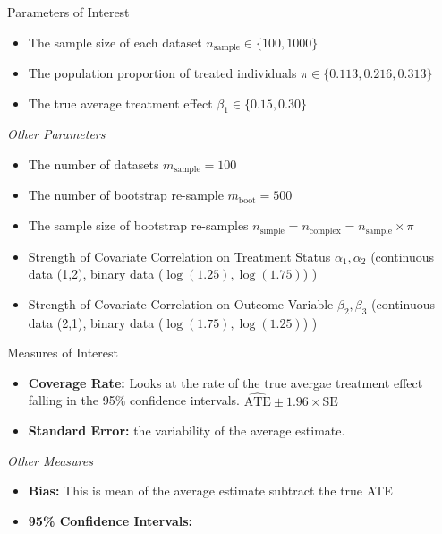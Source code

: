 \documentclass[
  ignorenonframetext,
]{beamer}
\providecommand{\tightlist}{%
  \setlength{\itemsep}{0pt}\setlength{\parskip}{0pt}}
\begin{document}
\begin{frame}{Parameters of Interest}
\protect\hypertarget{parameters-of-interest}{}

\begin{itemize}
\tightlist
\item
  The sample size of each dataset
  \(n_{\text{sample}} \in \{ 100, 1000 \}\)
\item
  The population proportion of treated individuals
  \(\pi \in \{ 0.113, 0.216, 0.313 \}\)
\item
  The true average treatment effect \(\beta_1 \in \{0.15, 0.30 \}\)
\end{itemize}

\emph{Other Parameters}

\begin{itemize}
\tightlist
\item
  The number of datasets \(m_{\text{sample}} = 100\)
\item
  The number of bootstrap re-sample \(m_{\text{boot}} = 500\)
\item
  The sample size of bootstrap re-samples
  \(n_{\text{simple}} = n_{\text{complex}} = n_{\text{sample}}\times \pi\)
\item
  Strength of Covariate Correlation on Treatment Status
  \(\alpha_1, \alpha_2\) (continuous data (1,2), binary data
  (\(\log(1.25), \log(1.75)\)) )
\item
  Strength of Covariate Correlation on Outcome Variable
  \(\beta_2, \beta_3\) (continuous data (2,1), binary data
  (\(\log(1.75), \log(1.25)\)) )
\end{itemize}

\end{frame}

\begin{frame}{Measures of Interest}
\protect\hypertarget{measures-of-interest}{}

\begin{itemize}
\tightlist
\item
  \textbf{Coverage Rate:} Looks at the rate of the true avergae
  treatment effect falling in the 95\% confidence intervals.
  \(\hat{\text{ATE}} \pm 1.96\times \text{SE}\)
\item
  \textbf{Standard Error:} the variability of the average estimate.
\end{itemize}

\emph{Other Measures}

\begin{itemize}
\tightlist
\item
  \textbf{Bias:} This is mean of the average estimate subtract the true
  ATE
\item
  \textbf{95\% Confidence Intervals:}
\end{itemize}

\end{frame}
\end{document}
